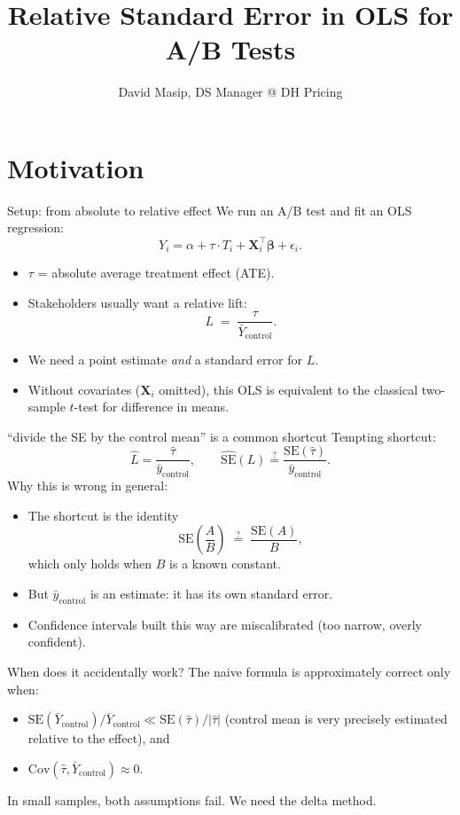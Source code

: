 \documentclass[10pt]{beamer}
\title{Relative Standard Error in OLS for A/B Tests}
\author{David Masip, DS Manager @ DH Pricing}
\date{}
\begin{document}
\maketitle

\section{Motivation}

\begin{frame}{Setup: from absolute to relative effect}
We run an A/B test and fit an OLS regression:
\[
Y_i = \alpha + \tau \cdot T_i + \mathbf{X}_i^\top \bm{\beta} + \epsilon_i .
\]
\begin{itemize}
  \item $\tau$ = \alert{absolute} average treatment effect (ATE).
  \item Stakeholders usually want a \alert{relative} lift:
  \[
    L \;=\; \frac{\tau}{\bar{Y}_{\text{control}}}.
  \]
  \item We need a point estimate \emph{and} a standard error for $L$.
  \item Without covariates ($\mathbf{X}_i$ omitted), this OLS is equivalent to the classical two-sample $t$-test for difference in means.
\end{itemize}
\end{frame}

\begin{frame}{``divide the SE by the control mean'' is a common shortcut}
Tempting shortcut:
\[
\hat{L} = \frac{\hat{\tau}}{\bar{y}_{\text{control}}}, \qquad
\widehat{\mathrm{SE}}(L) \stackrel{?}{=} \frac{\mathrm{SE}(\hat{\tau})}{\bar{y}_{\text{control}}}.
\]
Why this is \alert{wrong in general}:
\begin{itemize}
  \item The shortcut is the identity
  \[
  \mathrm{SE}\!\left(\frac{A}{B}\right) \;\stackrel{?}{=}\; \frac{\mathrm{SE}(A)}{B},
  \]
  which only holds when $B$ is a \alert{known constant}.
  \item But $\bar y_{\text{control}}$ is an estimate: it has its own standard error.
  \item Confidence intervals built this way are miscalibrated (too narrow, overly confident).
\end{itemize}
\end{frame}

\begin{frame}{When does it accidentally work?}
The naive formula is approximately correct only when:
\begin{itemize}
  \item $\mathrm{SE}(\bar{Y}_{\text{control}}) / \bar{Y}_{\text{control}} \ll \mathrm{SE}(\hat\tau)/|\hat\tau|$ (control mean is very precisely estimated relative to the effect), and
  \item $\mathrm{Cov}(\hat\tau, \bar{Y}_{\text{control}}) \approx 0$.
\end{itemize}
In small samples, both assumptions fail. We need the \alert{delta method}.
\end{frame}
\end{document}
